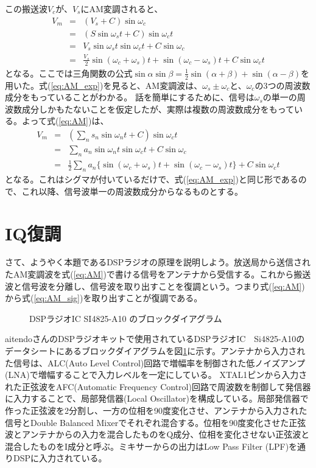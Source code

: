 この搬送波$V_c$が、$V_s$にAM変調されると、
\begin{eqnarray}
V_m &=& (V_s + C)\sin\omega_c \label{eq:AM}\\ 
&=&(S\sin\omega_s t + C)\sin\omega_c t \nonumber \\
&=& V_s\sin\omega_s t \sin\omega_c t + C\sin\omega_c \nonumber \\
&=& \frac{V_s}{2}{\sin(\omega_c + \omega_s)t + \sin(\omega_c - \omega_s)t} + C\sin\omega_ct \label{eq:AM_exp}
\end{eqnarray}
となる。ここでは三角関数の公式$\sin\alpha\sin\beta=\frac{1}{2}{\sin(\alpha+\beta)+\sin(\alpha-\beta)}$を用いた。式(\ref{eq:AM_exp})を見ると、AM変調波は、$\omega_s \pm \omega_c$と、$\omega_c$の3つの周波数成分をもっていることがわかる。
話を簡単にするために、信号は$\omega_s$の単一の周波数成分しかもたないことを仮定したが、実際は複数の周波数成分をもっている。よって式(\ref{eq:AM})は、
\begin{eqnarray}
V_m &=&  (\sum_n s_n\sin\omega_n t + C)\sin\omega_c t \nonumber \\
&=& \sum_n a_n\sin\omega_n t \sin\omega_c t + C\sin\omega_c \nonumber \\
&=& \frac{1}{2}\sum_n{a_n\{\sin(\omega_c + \omega_s)t + \sin(\omega_c - \omega_s)t}\} + C\sin\omega_ct \nonumber
\end{eqnarray}
となる。これはシグマが付いているだけで、式(\ref{eq:AM_exp})と同じ形であるので、これ以降、信号波単一の周波数成分からなるものとする。

\section*{IQ復調}
さて、ようやく本題であるDSPラジオの原理を説明しよう。放送局から送信されたAM変調波を式(\ref{eq:AM})で書ける信号をアンテナから受信する。これから搬送波と信号波を分離し、信号波を取り出すことを復調という。つまり式(\ref{eq:AM})から式(\ref{eq:AM_sig})を取り出すことが復調である。

\begin{figure}
\caption{DSPラジオIC SI4825-A10 のブロックダイアグラム}
\label{fig:block}
\end{figure}
aitendoさんのDSPラジオキットで使用されているDSPラジオIC　Si4825-A10のデータシートにあるブロックダイアグラムを図\ref{fig:block}に示す。アンテナから入力された信号は、ALC(Auto Level Control)回路で増幅率を制御された低ノイズアンプ(LNA)で増幅することで入力レベルを一定にしている。
XTAL1ピンから入力された正弦波をAFC(Automatic Frequency Control)回路で周波数を制御して発信器に入力することで、局部発信器(Local Oscillator)を構成している。局部発信器で作った正弦波を2分割し、一方の位相を90度変化させ、アンテナから入力された信号とDouble Balanced Mixerでそれぞれ混合する。位相を90度変化させた正弦波とアンテナからの入力を混合したものをQ成分、位相を変化させない正弦波と混合したものをI成分と呼ぶ。ミキサーからの出力はLow Pass Filter (LPF)を通りDSPに入力されている。

